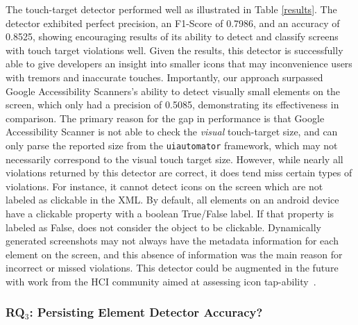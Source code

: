 The touch-target detector performed well as illustrated in Table \ref{results}. The detector exhibited perfect precision, an F1-Score of 0.7986, and an accuracy of 0.8525, showing encouraging results of its ability to detect and classify screens with touch target violations well.  Given the results, this detector is successfully able to give developers an insight into smaller icons that may inconvenience users with tremors and inaccurate touches. Importantly, our approach surpassed Google Accessibility Scanners's ability to detect visually small elements on the screen, which only had a precision of 0.5085, demonstrating its effectiveness in comparison. The primary reason for the gap in performance is that Google Accessibility Scanner is not able to check the \textit{visual} touch-target size, and can only parse the reported size from the \texttt{\small uiautomator} framework, which may not necessarily correspond to the visual touch target size. However, while nearly all violations returned by this detector are correct, it does tend miss certain types of violations. For instance, it cannot detect icons on the screen which are not labeled as clickable in the XML. By default, all elements on an android device have a clickable property with a boolean True/False label. If that property is labeled as False, \MotorEase does not consider the object to be clickable. Dynamically generated screenshots may not always have the metadata information for each element on the screen, and this absence of information was the main reason for incorrect or missed violations. This detector could be augmented in the future with work from the HCI community aimed at assessing icon tap-ability~\cite{Swearngin:CHI'19}. %





\subsubsection{RQ$_3$: Persisting Element Detector Accuracy?}


